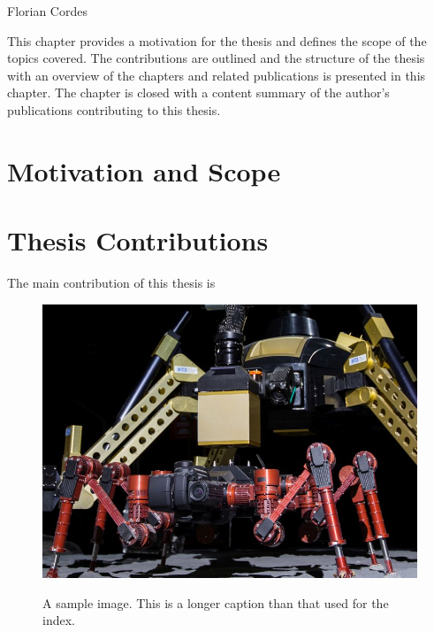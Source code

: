 
       {Florian Cordes}

This chapter provides a motivation for the thesis and defines the scope of the topics covered.
The contributions are outlined and the structure of the thesis with an overview of the chapters and related publications is presented in this chapter.
The chapter is closed with a content summary of the author's publications contributing to this thesis.


\section{Motivation and Scope}
\label{sec:Intoduction:Motivation}
\lipsum

\section{Thesis Contributions}
The main contribution of this thesis is 

\begin{figure}%
  \centering
  \hypersetup{linkcolor=captionTextColor}
  \includegraphics[width=0.8\linewidth]{pictures/RIMRES-final-14}\\
  \caption[A sample image]
          {A sample image. This is a longer caption than that used for the index.}
  \label{fig:RIMRES-final-14}
\end{figure}

